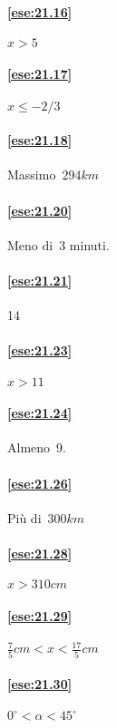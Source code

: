 \begin{multicols}{2}
\paragraph{\ref{ese:21.16}} $x>5$

\paragraph{\ref{ese:21.17}} $x\le -2/3$

\paragraph{\ref{ese:21.18}} Massimo~$294\unit{km}$

\paragraph{\ref{ese:21.20}} Meno di~3 minuti.

\paragraph{\ref{ese:21.21}} 14

\paragraph{\ref{ese:21.23}} $x>11$

\paragraph{\ref{ese:21.24}} Almeno~9.

\paragraph{\ref{ese:21.26}} Più di~$300\unit{km}$

\paragraph{\ref{ese:21.28}} $x>310\unit{cm}$

\paragraph{\ref{ese:21.29}} $\frac{7}{5}\unit{cm}<x<\frac{17}{5}\unit{cm}$

\paragraph{\ref{ese:21.30}} $0^{\circ}<\alpha<45^{\circ}$


\end{multicols}
